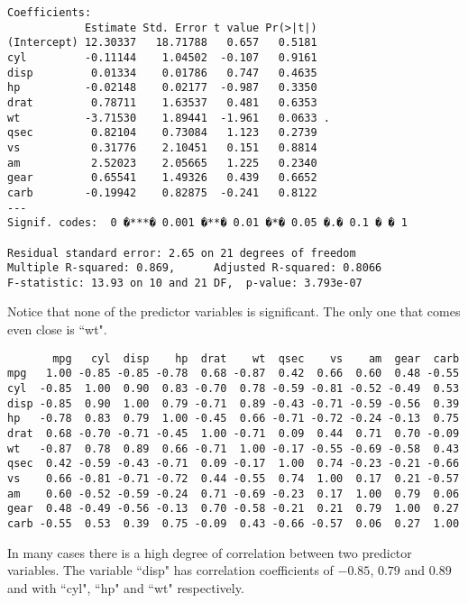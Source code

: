 \begin{verbatim}
Coefficients:
            Estimate Std. Error t value Pr(>|t|)
(Intercept) 12.30337   18.71788   0.657   0.5181
cyl         -0.11144    1.04502  -0.107   0.9161
disp         0.01334    0.01786   0.747   0.4635
hp          -0.02148    0.02177  -0.987   0.3350
drat         0.78711    1.63537   0.481   0.6353
wt          -3.71530    1.89441  -1.961   0.0633 .
qsec         0.82104    0.73084   1.123   0.2739
vs           0.31776    2.10451   0.151   0.8814
am           2.52023    2.05665   1.225   0.2340
gear         0.65541    1.49326   0.439   0.6652
carb        -0.19942    0.82875  -0.241   0.8122
---
Signif. codes:  0 �***� 0.001 �**� 0.01 �*� 0.05 �.� 0.1 � � 1

Residual standard error: 2.65 on 21 degrees of freedom
Multiple R-squared: 0.869,      Adjusted R-squared: 0.8066
F-statistic: 13.93 on 10 and 21 DF,  p-value: 3.793e-07
\end{verbatim}
Notice that none of the predictor variables is significant. The only one that comes even close is ``wt".

\small
\begin{verbatim}
       mpg   cyl  disp    hp  drat    wt  qsec    vs    am  gear  carb
mpg   1.00 -0.85 -0.85 -0.78  0.68 -0.87  0.42  0.66  0.60  0.48 -0.55
cyl  -0.85  1.00  0.90  0.83 -0.70  0.78 -0.59 -0.81 -0.52 -0.49  0.53
disp -0.85  0.90  1.00  0.79 -0.71  0.89 -0.43 -0.71 -0.59 -0.56  0.39
hp   -0.78  0.83  0.79  1.00 -0.45  0.66 -0.71 -0.72 -0.24 -0.13  0.75
drat  0.68 -0.70 -0.71 -0.45  1.00 -0.71  0.09  0.44  0.71  0.70 -0.09
wt   -0.87  0.78  0.89  0.66 -0.71  1.00 -0.17 -0.55 -0.69 -0.58  0.43
qsec  0.42 -0.59 -0.43 -0.71  0.09 -0.17  1.00  0.74 -0.23 -0.21 -0.66
vs    0.66 -0.81 -0.71 -0.72  0.44 -0.55  0.74  1.00  0.17  0.21 -0.57
am    0.60 -0.52 -0.59 -0.24  0.71 -0.69 -0.23  0.17  1.00  0.79  0.06
gear  0.48 -0.49 -0.56 -0.13  0.70 -0.58 -0.21  0.21  0.79  1.00  0.27
carb -0.55  0.53  0.39  0.75 -0.09  0.43 -0.66 -0.57  0.06  0.27  1.00
\end{verbatim}
\normalsize

In many cases there is a high degree of correlation between two predictor variables. The variable ``disp" has correlation coefficients of $-0.85$, $0.79$ and $0.89$ and with ``cyl", ``hp" and ``wt" respectively.

